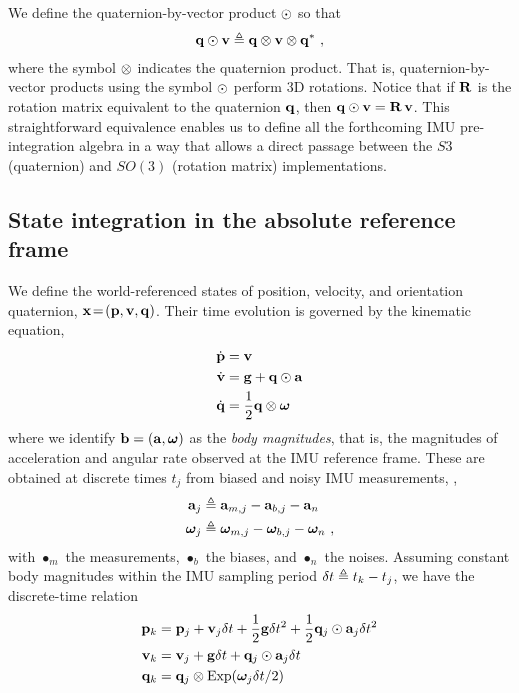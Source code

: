 We define the quaternion-by-vector product $\odot$ so that
%
\begin{align}
{\bf q}\odot{\bf v} \triangleq {\bf q}\otimes{\bf v}\otimes{\bf q}^*
~,
\end{align}
%
where the symbol $\otimes$ indicates the quaternion product.
That is, quaternion-by-vector products using the symbol $\odot$ perform 3D rotations. 
Notice that if ${\bf R}$ is the rotation matrix equivalent to the quaternion ${\bf q}$, then 
%
${\bf q}\odot{\bf v} = {\bf R}\,{\bf v}$. 
%
This straightforward equivalence
enables us to define all the forthcoming IMU pre-integration algebra in a way that allows a direct passage between the $S3$ (quaternion) and $SO(3)$ (rotation matrix) implementations.





\subsection{State integration in the absolute reference frame}

We define the world-referenced states of position, velocity, and orientation quaternion, ${\bf x}\!=\!({\bf p},{\bf v},{\bf q})$. 
Their time evolution is governed by the kinematic equation,
%
\begin{align}\label{equ:cont_basic}
\begin{split}
\dot{{\bf p}} &= {\bf v} \\
\dot{{\bf v}} &= {\bf g} + {\bf q}\odot{\bf a} \\
\dot{{\bf q}} &= \frac12{\bf q}\otimes{{\bm \omega}} 
\end{split}
\end{align}
%
where we identify ${\bf b}=({\bf a},{{\bm \omega}})$ as the \emph{body magnitudes}, that is, the magnitudes of acceleration and angular rate observed at the IMU reference frame. These are obtained at discrete times $t_j$ from biased and noisy IMU measurements, \ie,
%
\begin{align}\label{equ:body}
\begin{split}
{\bf a}_j &\triangleq {\bf a}_{m,j} - {\bf a}_{b,j} - {\bf a}_n \\
{{\bm \omega}}_j  &\triangleq {{\bm \omega}}_{m,j}  - {{\bm \omega}}_{b,j}  - {{\bm \omega}}_n 
~,
\end{split}
\end{align}
%
with $\bullet_m$ the measurements, $\bullet_b$ the biases, and $\bullet_n$ the noises.
Assuming constant body magnitudes within the IMU sampling period $\delta t\triangleq t_k-t_j$, we have the discrete-time relation
%
\begin{align}\label{equ:integration_state}
\begin{split}
{\bf p}_{k} &= {\bf p}_j + {\bf v}_j\delta t  + \frac12{\bf g}\delta t^2 + \frac12{\bf q}_j\odot{\bf a}_j\delta t^2 \\
{\bf v}_{k} &= {\bf v}_j + {\bf g}\delta t + {\bf q}_j\odot{\bf a}_j\delta t \\
{\bf q}_{k} &= {\bf q}_j\otimes\operatorname*{Exp}({{\bm \omega}}_j\delta t/2) 
\end{split}
\end{align}


